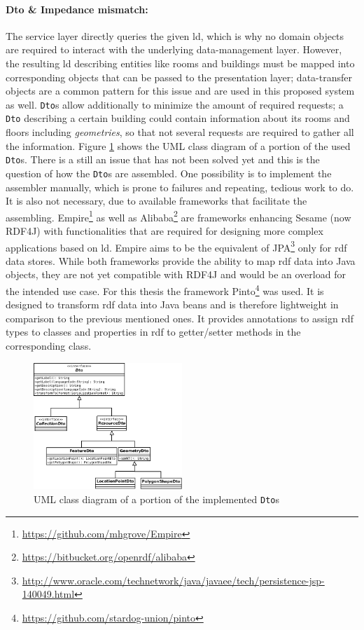 \documentclass[draft,final]{vutinfth} %
\begin{document}
\paragraph{Dto \& Impedance mismatch:} The service layer directly queries the given \gls{ld}, which is why no domain objects are required to interact with the underlying data-management layer. However, the resulting \gls{ld} describing entities like rooms and buildings must be mapped into corresponding objects that can be passed to the presentation layer; data-transfer objects are a common pattern for this issue and are used in this proposed system as well. \texttt{Dto}s allow additionally to minimize the amount of required requests; a \texttt{Dto} describing a certain building could contain information about its rooms and floors including \textit{geometries}, so that not several requests are required to gather all the information. Figure \ref{fig:solution-architectural-prototype:dto-uml} shows the UML class diagram of a portion of the used \texttt{Dto}s. There is a still an issue that has not been solved yet and this is the question of how the \texttt{Dto}s are assembled. One possibility is to implement the assembler manually, which is prone to failures and repeating, tedious work to do. It is also not necessary, due to available frameworks that facilitate the assembling. Empire\footnote{\url{https://github.com/mhgrove/Empire}} as well as Alibaba\footnote{\url{https://bitbucket.org/openrdf/alibaba}} are frameworks enhancing Sesame (now RDF4J) with functionalities that are required for designing more complex applications based on \gls{ld}. Empire aims to be the equivalent of JPA\footnote{\url{http://www.oracle.com/technetwork/java/javaee/tech/persistence-jsp-140049.html}} only for \gls{rdf} data stores. While both frameworks provide the ability to map \gls{rdf} data into Java objects, they are not yet compatible with RDF4J and would be an overload for the intended use case. For this thesis the framework Pinto\footnote{\url{https://github.com/stardog-union/pinto}} was used. It is designed to transform \gls{rdf} data into Java beans and is therefore lightweight in comparison to the previous mentioned ones. It provides annotations to assign \gls{rdf} types to classes and properties in \gls{rdf} to getter/setter methods in the corresponding class.

\begin{figure}[h]
    \centering
    \includegraphics[width=0.5\textwidth]{graphics/solution/architecture/dto.png}
    \caption{UML class diagram of a portion of the implemented \texttt{Dto}s}
    \label{fig:solution-architectural-prototype:dto-uml}
\end{figure}
\end{document}
